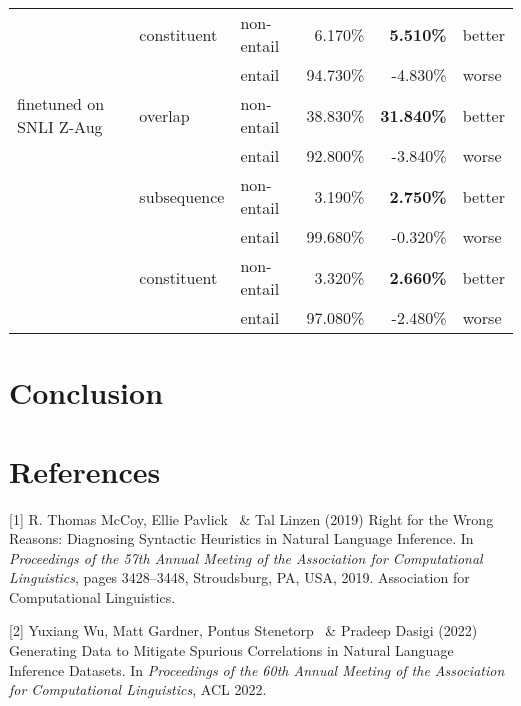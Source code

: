 \documentclass{article}
\begin{document}
\begin{table}[]
\begin{tabular}{lllrrl}
                                          & constituent         & non-entail          & 6.170\%                                & \textbf{5.510\%}                                & better        \\
                                          &                     & entail              & 94.730\%                               & -4.830\%                                        & worse         \\
        finetuned on SNLI Z-Aug          & overlap             & non-entail          & 38.830\%                               & \textbf{31.840\%}                               & better        \\
                                          &                     & entail              & 92.800\%                               & -3.840\%                                        & worse         \\
                                          & subsequence         & non-entail          & 3.190\%                                & \textbf{2.750\%}                                & better        \\
                                          &                     & entail              & 99.680\%                               & -0.320\%                                        & worse         \\
                                          & constituent         & non-entail          & 3.320\%                                & \textbf{2.660\%}                                & better        \\
                                          &                     & entail              & 97.080\%                               & -2.480\%                                        & worse        \\ \hline
    \end{tabular}
\end{table}


\section{Conclusion}


\section*{References}

{
\small

\label{ref1}
[1] R. Thomas McCoy, Ellie Pavlick \ \& Tal Linzen (2019) Right for the Wrong Reasons: Diagnosing Syntactic Heuristics in Natural Language Inference. In {\it Proceedings of the 57th Annual Meeting of the Association for Computational Linguistics}, pages 3428–3448, Stroudsburg, PA, USA, 2019. Association for Computational Linguistics.

\label{ref2}
[2] Yuxiang Wu, Matt Gardner, Pontus Stenetorp \ \& Pradeep Dasigi (2022) Generating Data to Mitigate Spurious Correlations in Natural Language Inference Datasets. In {\it Proceedings of the 60th Annual Meeting of the Association for Computational Linguistics}, ACL 2022.
}

\end{document}
